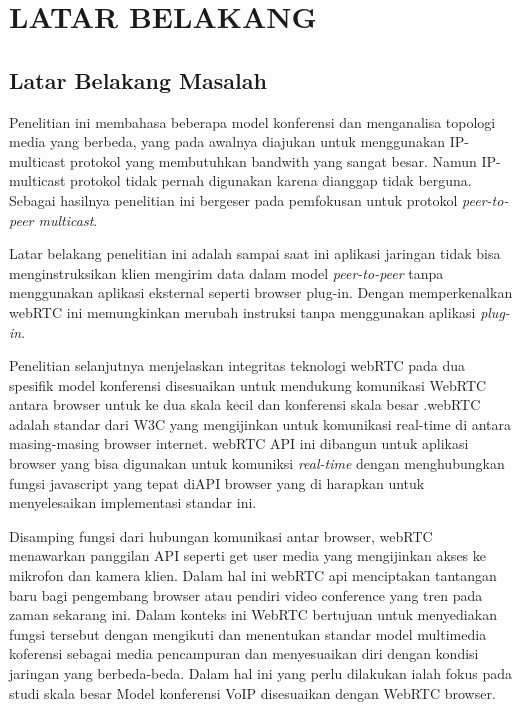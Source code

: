 \documentclass{jtetiproposalskripsi}
\begin{document}
\tableofcontents
{}
\clearpage{}\setcounter{page}{1}

\chapter{LATAR BELAKANG}

\section{Latar Belakang Masalah}
Penelitian ini membahasa beberapa model konferensi dan menganalisa topologi media yang berbeda, yang pada awalnya diajukan untuk menggunakan IP-multicast protokol yang membutuhkan bandwith yang sangat besar. Namun IP-multicast protokol tidak pernah digunakan karena dianggap tidak berguna. Sebagai hasilnya penelitian ini bergeser pada pemfokusan untuk protokol \emph{peer-to-peer multicast}.

Latar belakang penelitian ini adalah sampai saat ini aplikasi jaringan tidak bisa menginstruksikan klien mengirim data dalam model \emph{peer-to-peer} tanpa menggunakan aplikasi eksternal seperti browser plug-in. Dengan memperkenalkan webRTC ini memungkinkan merubah instruksi tanpa menggunakan aplikasi \emph {plug-in}.

Penelitian selanjutnya menjelaskan integritas teknologi webRTC pada dua spesifik model konferensi disesuaikan untuk mendukung komunikasi WebRTC antara browser untuk ke dua skala kecil dan konferensi skala besar .webRTC adalah standar dari W3C yang mengijinkan untuk komunikasi real-time di antara masing-masing browser internet. webRTC API ini dibangun untuk aplikasi browser yang bisa digunakan untuk komuniksi \emph{real-time} dengan menghubungkan fungsi javascript yang tepat diAPI browser yang di harapkan untuk menyelesaikan implementasi standar ini.

Disamping fungsi dari hubungan komunikasi antar browser, webRTC menawarkan panggilan API seperti get user media yang mengijinkan akses ke mikrofon dan kamera klien. Dalam hal ini webRTC api menciptakan tantangan baru bagi pengembang browser atau pendiri video conference yang tren pada zaman sekarang ini. Dalam konteks ini WebRTC bertujuan untuk menyediakan fungsi tersebut dengan mengikuti dan menentukan standar model multimedia koferensi sebagai media pencampuran dan menyesuaikan diri dengan kondisi jaringan yang berbeda-beda. Dalam hal ini yang perlu dilakukan ialah fokus pada studi skala besar Model konferensi VoIP disesuaikan dengan WebRTC browser.
\end{document}

